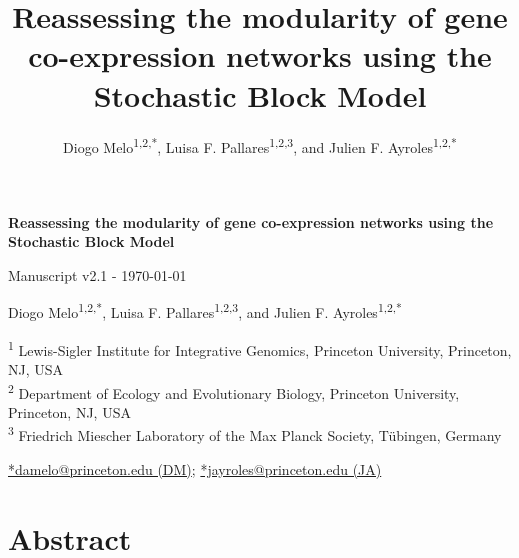 \documentclass[
]{article}
\title{Reassessing the modularity of gene co-expression networks using
the Stochastic Block Model}
\author{Diogo Melo\textsuperscript{1,2,*},
Luisa F. Pallares\textsuperscript{1,2,3}, and
Julien F. Ayroles\textsuperscript{1,2,*}}
\date{}
\begin{document}
\makeatletter
\renewcommand{\maketitle}{\setlength{\parindent}{0pt}
\begin{flushleft}
    \huge{\titlefont \textbf{Reassessing the modularity of gene
co-expression networks using the Stochastic Block Model}}
    
          \vspace{0.2cm}
      \small{Manuscript v2.1 - \today}
    
    \vspace{0.2cm}

    \Large{Diogo Melo\textsuperscript{1,2,*},
Luisa F. Pallares\textsuperscript{1,2,3}, and
Julien F. Ayroles\textsuperscript{1,2,*}}

    \vspace{0.3cm}

\end{flushleft}
}
\makeatother
\maketitle



\footnotesize
\textsuperscript{1} Lewis-Sigler Institute for Integrative Genomics,
Princeton University, Princeton, NJ, USA\\
\textsuperscript{2} Department of Ecology and Evolutionary Biology,
Princeton University, Princeton, NJ, USA\\
\textsuperscript{3} Friedrich Miescher Laboratory of the Max Planck
Society, Tübingen, Germany

\href{mailto:damelo@princeton.edu}{*damelo@princeton.edu (DM)};
\href{mailto:jayroles@princeton.edu}{*jayroles@princeton.edu (JA)}

\normalsize

\section{Abstract}\label{abstract}
\end{document}
